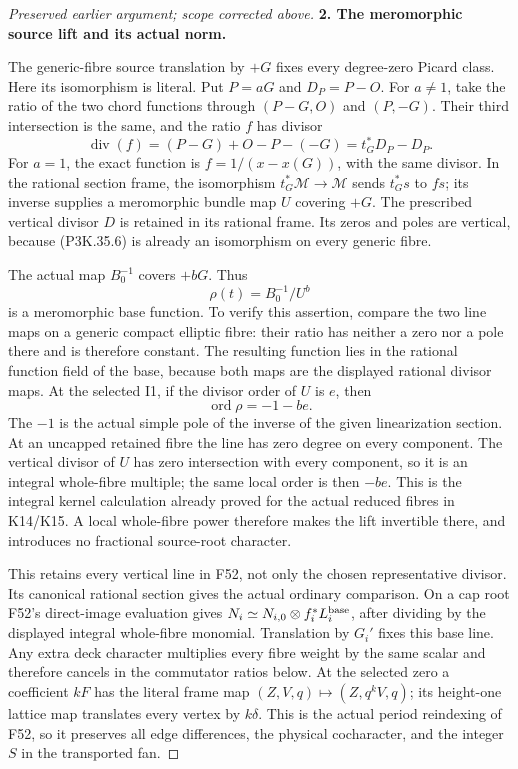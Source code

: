 \begin{proof}[Preserved earlier argument; scope corrected above]
\par\medskip\noindent\textbf{2. The meromorphic source lift and its actual norm.}\enspace

The generic-fibre source translation by \(+G\) fixes every degree-zero
Picard class. Here its isomorphism is literal. Put \(P=aG\) and
\(D_P=P-O\). For \(a\ne1\), take the ratio of the two chord functions
through \((P-G,O)\) and \((P,-G)\). Their third intersection is the
same, and the ratio \(f\) has divisor
\[
             \operatorname{div}(f)
                 =(P-G)+O-P-(-G)=t_G^*D_P-D_P.         \tag{P3K.35.6}
\]
For \(a=1\), the exact function is \(f=1/(x-x(G))\), with the
same divisor. In the rational section frame, the isomorphism
\(t_G^*\mathcal M\to\mathcal M\) sends \(t_G^*s\) to \(fs\);
its inverse supplies a meromorphic bundle map \(U\) covering \(+G\).
The prescribed vertical divisor \(D\) is retained in its rational
frame. Its zeros and poles are vertical, because (P3K.35.6) is already
an isomorphism on every generic fibre.

The actual map \(B_0^{-1}\) covers \(+bG\). Thus
\[
                        \rho(t)=B_0^{-1}/U^b            \tag{P3K.35.7}
\]
is a meromorphic base function. To verify this assertion, compare the
two line maps on a generic compact elliptic fibre: their ratio has
neither a zero nor a pole there and is therefore constant. The resulting
function lies in the rational function field of the base, because both
maps are the displayed rational divisor maps. At the selected I1, if
the divisor order of \(U\) is \(e\), then
\[
                      \operatorname{ord}\rho=-1-be.     \tag{P3K.35.8}
\]
The \(-1\) is the actual simple pole of the inverse of the given
linearization section. At an uncapped retained fibre the line has zero
degree on every component. The vertical divisor of \(U\) has zero
intersection with every component, so it is an integral whole-fibre
multiple; the same local order is then \(-be\). This is the integral
kernel calculation already proved for the actual reduced fibres in
K14/K15. A local whole-fibre power therefore makes the lift invertible
there, and introduces no fractional source-root character.

This retains every vertical line in F52, not only the chosen
representative divisor. Its canonical rational section gives the
actual ordinary comparison. On a cap root F52's direct-image
evaluation gives \(N_i\simeq N_{i,0}\otimes f_i^*L_i^{\rm base}\),
after dividing by the displayed integral whole-fibre monomial.
Translation by \(G_i'\) fixes this base line. Any extra deck
character multiplies every fibre weight by the same scalar and
therefore cancels in the commutator ratios below. At the selected
zero a coefficient \(kF\) has the literal frame map
\((Z,V,q)\mapsto(Z,q^kV,q)\); its height-one lattice map translates
every vertex by \(k\delta\). This is the actual period reindexing
of F52, so it preserves all edge differences, the physical
cocharacter, and the integer \(S\) in the transported fan.


\end{proof}
